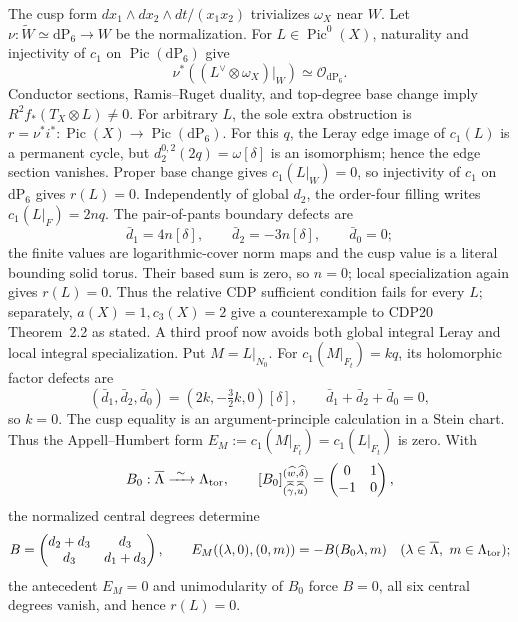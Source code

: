 {\ResultSmall
The cusp form \(dx_1\wedge dx_2\wedge dt/(x_1x_2)\) trivializes \(\omega_X\)
near \(W\).  Let \(\nu:\widetilde W\simeq\mathrm{dP}_6\to W\) be the
normalization.  For \(L\in\operatorname{Pic}^0(X)\), naturality and injectivity
of \(c_1\) on \(\operatorname{Pic}(\mathrm{dP}_6)\) give
\[
 \nu^*((L^\vee\otimes\omega_X)|_W)\simeq\mathcal O_{\mathrm{dP}_6}.
\]
Conductor sections, Ramis--Ruget duality, and top-degree base change imply
\(R^2f_*(T_X\otimes L)\ne0\).  For arbitrary \(L\), the sole extra obstruction
is \(r=\nu^*i^*:\operatorname{Pic}(X)\to\operatorname{Pic}(\mathrm{dP}_6)\).
For this \(q\), the Leray edge image of \(c_1(L)\) is a permanent cycle, but
\(d_2^{0,2}(2q)=\omega[\delta]\) is an isomorphism; hence the edge section
vanishes.  Proper base change gives \(c_1(L|_W)=0\), so injectivity of
\(c_1\) on \(\mathrm{dP}_6\) gives \(r(L)=0\).  Independently of global
\(d_2\), the order-four filling writes \(c_1(L|_F)=2nq\).  The
pair-of-pants boundary defects are
\[
 \bar d_1=4n[\delta],\qquad \bar d_2=-3n[\delta],\qquad \bar d_0=0;
\]
the finite values are logarithmic-cover norm maps and the cusp value is a
literal bounding solid torus.  Their based sum is zero, so \(n=0\); local
specialization again gives \(r(L)=0\).  Thus the relative CDP sufficient
condition fails for every \(L\); separately, \(a(X)=1,c_3(X)=2\) give a
counterexample to CDP20
Theorem~2.2 as stated.  A third proof now avoids both global integral Leray
and local integral specialization.  Put \(M=L|_{N_0}\).  For
\(c_1(M|_{F_t})=kq\), its holomorphic
factor defects are
\[
 (\bar d_1,\bar d_2,\bar d_0)=(2k,-\tfrac32k,0)[\delta],
 \qquad \bar d_1+\bar d_2+\bar d_0=0,
\]
so \(k=0\).  The cusp equality is an argument-principle calculation in a
Stein chart.  Thus the Appell--Humbert form
\(E_M:=c_1(M|_{F_t})=c_1(L|_{F_t})\) is zero.  With
\[
 B_0:\overline\Lambda\xrightarrow{\ \sim\ }\Lambda_{\rm tor},\qquad
 [B_0]_{(\overline{\widehat\gamma},\overline{\widehat u})}
 ^{(\widehat w,\widehat\delta)}
 =\begin{pmatrix}0&1\\-1&0\end{pmatrix},
\]
the normalized central degrees determine
\[
 B=\begin{pmatrix}d_2+d_3&d_3\\d_3&d_1+d_3\end{pmatrix},
 \qquad E_M((\lambda,0),(0,m))=-B(B_0\lambda,m)
 \quad(\lambda\in\overline\Lambda,\ m\in\Lambda_{\rm tor});
\]
the antecedent \(E_M=0\) and unimodularity of \(B_0\) force \(B=0\), all
six central degrees vanish, and hence \(r(L)=0\).
}


